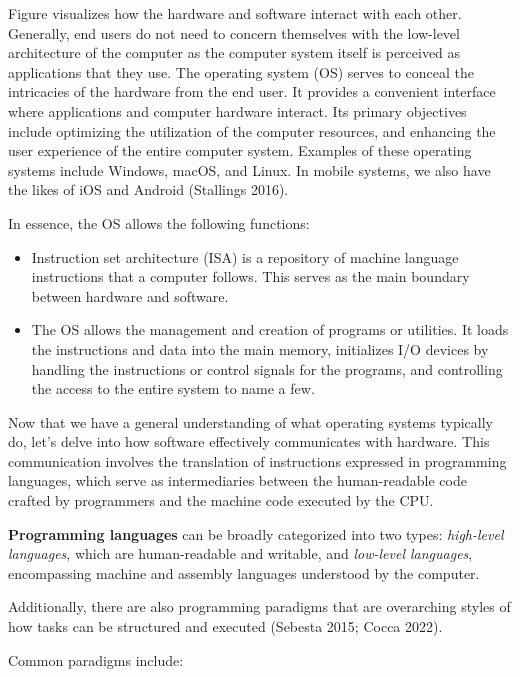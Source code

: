 \documentclass[
  letterpaper,
  DIV=11,
  numbers=noendperiod]{scrreprt}
\providecommand{\tightlist}{%
  \setlength{\itemsep}{0pt}\setlength{\parskip}{0pt}}\usepackage{longtable,booktabs,array}
\begin{document}
Figure visualizes how the hardware and software interact with each
other. Generally, end users do not need to concern themselves with the
low-level architecture of the computer as the computer system itself is
perceived as applications that they use. The operating system (OS)
serves to conceal the intricacies of the hardware from the end user. It
provides a convenient interface where applications and computer hardware
interact. Its primary objectives include optimizing the utilization of
the computer resources, and enhancing the user experience of the entire
computer system. Examples of these operating systems include Windows,
macOS, and Linux. In mobile systems, we also have the likes of iOS and
Android (Stallings 2016).

In essence, the OS allows the following functions:

\begin{itemize}
\tightlist
\item
  Instruction set architecture (ISA) is a repository of machine language
  instructions that a computer follows. This serves as the main boundary
  between hardware and software.
\item
  The OS allows the management and creation of programs or utilities. It
  loads the instructions and data into the main memory, initializes I/O
  devices by handling the instructions or control signals for the
  programs, and controlling the access to the entire system to name a
  few.
\end{itemize}

Now that we have a general understanding of what operating systems
typically do, let's delve into how software effectively communicates
with hardware. This communication involves the translation of
instructions expressed in programming languages, which serve as
intermediaries between the human-readable code crafted by programmers
and the machine code executed by the CPU.

\textbf{Programming languages} can be broadly categorized into two
types: \emph{high-level languages}, which are human-readable and
writable, and \emph{low-level languages}, encompassing machine and
assembly languages understood by the computer.

Additionally, there are also programming paradigms that are overarching
styles of how tasks can be structured and executed (Sebesta 2015; Cocca
2022).

Common paradigms include:
\end{document}

